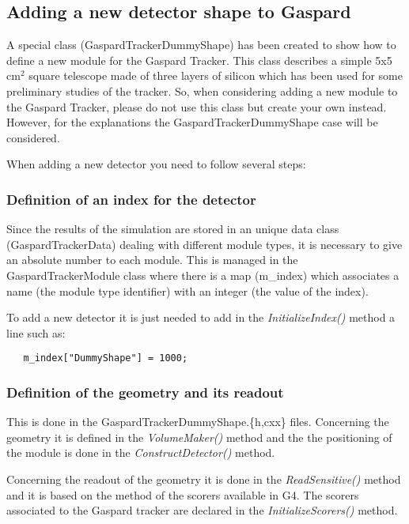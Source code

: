 \documentclass[a4paper,12pt]{article}
\begin{document}
\subsection{Adding a new detector shape to Gaspard}
A special class (GaspardTrackerDummyShape) has been created to show how
to define a new module for the Gaspard Tracker. This class describes a
simple 5x5 cm$^2$ square telescope made of three layers of silicon which  
has been used for some preliminary studies of the tracker. So, when 
considering adding a new module to the Gaspard Tracker, please do not use
this class but create your own instead. However, for the explanations the 
GaspardTrackerDummyShape case will be considered.

When adding a new detector you need to follow several steps:

\subsubsection{Definition of an index for the detector}
Since the results of the simulation are stored in an unique data class 
(GaspardTrackerData) dealing with different module types, it is 
necessary to give an absolute number to each module. This is managed in
the GaspardTrackerModule class where there is a map (m\_index) which
associates a name (the module type identifier) with an integer (the value 
of the index).

To add a new detector it is just needed to add in the {\it InitializeIndex()}
method a line such as:

\begin{verbatim}
   m_index["DummyShape"] = 1000;
\end{verbatim}

\subsubsection{Definition of the geometry and its readout}
This is done in the GaspardTrackerDummyShape.\{h,cxx\} files. Concerning
the geometry it is defined in the {\it VolumeMaker()} method and the 
the positioning of the module is done in the {\it ConstructDetector()} 
method. 

Concerning the readout of the geometry it is done in the {\it ReadSensitive()} 
method and it is based on the method of the scorers available in G4. The 
scorers associated to the Gaspard tracker are declared in the {\it 
InitializeScorers()} method.
\end{document}
